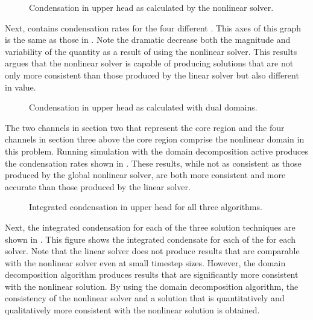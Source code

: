 \begin{figure}[h!t]
\centering

\caption{Condensation in upper head as calculated by the nonlinear solver.}
\label{fig:refloodGammaNln}
\end{figure}

Next,  contains condensation rates for the four different \dtmax{}.
This axes of this graph is the same as those in .
Note the dramatic decrease both the magnitude and variability of the quantity as a result of using the nonlinear solver.
This results argues that the nonlinear solver is capable of producing solutions that are not only  more consistent than those produced by the linear solver but also different in value.

\begin{figure}[h!t]
\centering

\caption{Condensation in upper head as calculated with dual domains.}
\label{fig:refloodGammaDom}
\end{figure}

The two channels in section two that represent the core region and the four channels in section three above the core region comprise the nonlinear domain in this problem.
Running simulation with the domain decomposition active produces the condensation rates shown in .
These results, while not as consistent as those produced by the global nonlinear solver, are both more consistent and more accurate than those produced by the linear solver.

\begin{figure}[h!t]
\centering

\caption{Integrated condensation in upper head for all three algorithms.}
\label{fig:refloodMaxGamma}
\end{figure}

Next, the integrated condensation for each of the three solution techniques are shown in .
This figure shows the integrated condensate for each of the \dtmax{} for each solver.
Note that the linear solver does not produce results that are comparable with the nonlinear solver even at small timestep sizes.
However, the domain decomposition algorithm produces results that are significantly more consistent with the nonlinear solution.
By using the domain decomposition algorithm, the consistency of the nonlinear solver and a solution that is quantitatively and qualitatively more consistent with the nonlinear solution is obtained.


